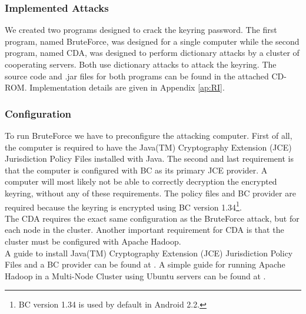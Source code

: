 \documentclass[pdftex,english,10pt,b5paper,twoside]{book}
\begin{document}
\subsubsection{Implemented Attacks} We created two programs designed to crack
the keyring password. The first program, named BruteForce, was designed for a
single computer while the second program, named \ac{CDA}, was designed to
perform dictionary attacks by a cluster of cooperating servers. Both use
dictionary attacks to attack the keyring. The source code and .jar files for
both programs can be found in the attached CD-ROM. Implementation details are
given in Appendix \ref{ap:RI}.

\subsubsection{Configuration}
To run BruteForce we have to preconfigure the attacking computer. First of
all, the computer is required to have the Java(TM) Cryptography Extension (JCE)
Jurisdiction Policy Files installed with Java. The second and last requirement is that
the computer is configured with \ac{BC} as its primary JCE provider.
A computer will most likely not be able to correctly decryption the encrypted
keyring, without any of these requirements. The policy files and BC provider are
required because the keyring is encrypted using BC version 1.34\footnote{BC version
1.34 is used by default in Android 2.2.}.\\

\noindent The CDA requires the exact same configuration as the BruteForce
attack, but for each node in the cluster. Another important requirement for CDA
is that the cluster must be configured with Apache Hadoop.\\

\noindent A guide to install Java(TM) Cryptography Extension (JCE) Jurisdiction
Policy Files and a BC provider can be found at \cite{jce+bc}. A simple guide for
running Apache Hadoop in a Multi-Node Cluster using Ubuntu servers can be found
at \cite{cluster}.
\end{document}
